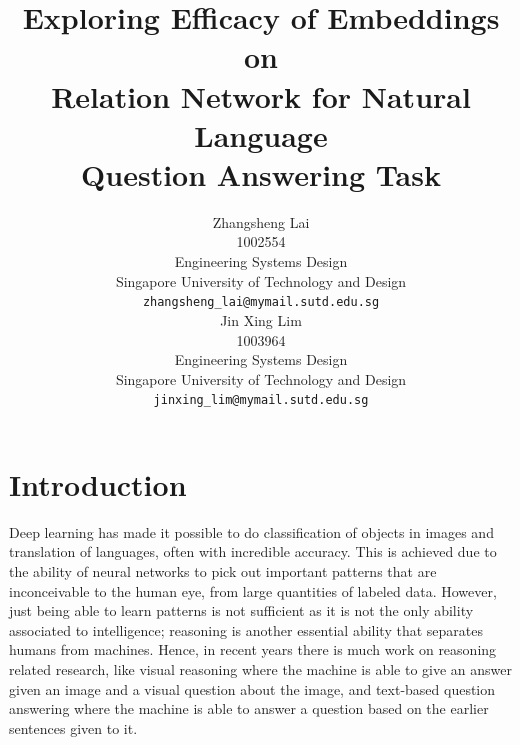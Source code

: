 \documentclass{article}
\title{Exploring Efficacy of Embeddings on \\ Relation Network for Natural Language \\ Question Answering Task}
\author{
Zhangsheng Lai \\
1002554\\
Engineering Systems Design\\
  Singapore University of Technology and Design\\
  \texttt{zhangsheng\_lai@mymail.sutd.edu.sg} \\
\And
Jin Xing Lim \\
1003964\\
Engineering Systems Design\\
  Singapore University of Technology and Design\\
  \texttt{jinxing\_lim@mymail.sutd.edu.sg} \\  %
}
\begin{document}

\maketitle



\section{Introduction}
%

	Deep learning has made it possible to do classification of objects in images and translation of languages, often with incredible accuracy. This is achieved due to the ability of neural networks to pick out important patterns that are inconceivable to the human eye, from large quantities of labeled data. However, just being able to learn patterns is not sufficient as it is not the only ability associated to intelligence; reasoning is another essential ability \cite{Bottou2011} that separates humans from machines. Hence, in recent years there is much work on reasoning related research, like visual reasoning \cite{Johnson2017, Santoro2017} where the machine is able to give an answer given an image and a visual question about the image, and text-based question answering \cite{Santoro2017} where the machine is able to answer a question based on the earlier sentences given to it. 
\end{document}
